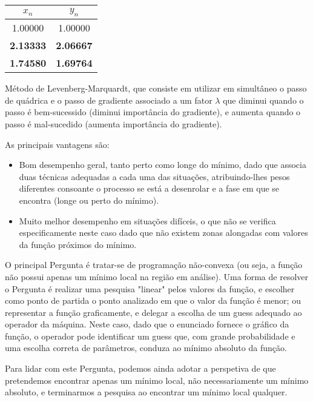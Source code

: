 {


\begin{center}
    \begin{tabular}{c | c}
        $x_n$ & $y_n$ \\ \hline
        1.00000 & 1.00000 \\
        \textbf{2.13333} & \textbf{2.06667} \\
        \textbf{1.74580} & \textbf{1.69764}
    \end{tabular}
\end{center}

Método de Levenberg-Marquardt, que consiste em utilizar em simultâneo o passo de quádrica e o passo de gradiente associado a um fator $\lambda$ que diminui quando o passo é bem-sucessido (diminui importância do gradiente), e aumenta quando o passo é mal-sucedido (aumenta importância do gradiente).

As principais vantagens são:
\begin{itemize}
    \item Bom desempenho geral, tanto perto como longe do mínimo, dado que associa duas técnicas adequadas a cada uma das situações, atribuindo-lhes pesos diferentes consoante o processo se está a desenrolar e a fase em que se encontra (longe ou perto do mínimo).
    \item Muito melhor desempenho em situações difíceis, o que não se verifica especificamente neste caso dado que não existem zonas alongadas com valores da função próximos do mínimo.
\end{itemize}

O principal Pergunta é tratar-se de programação não-convexa (ou seja, a função não possui apenas um mínimo local na região em análise). Uma forma de resolver o Pergunta é realizar uma pesquisa "linear" pelos valores da função, e escolher como ponto de partida o ponto analizado em que o valor da função é menor; ou representar a função graficamente, e delegar a escolha de um guess adequado ao operador da máquina. Neste caso, dado que o enunciado fornece o gráfico da função, o operador pode identificar um guess que, com grande probabilidade e uma escolha correta de parâmetros, conduza ao mínimo absoluto da função.\par
Para lidar com este Pergunta, podemos ainda adotar a perspetiva de que pretendemos encontrar apenas um mínimo local, não necessariamente um mínimo absoluto, e terminarmos a pesquisa ao encontrar um mínimo local qualquer.

}
